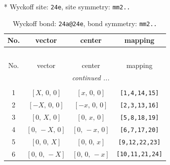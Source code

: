 \documentclass[fleqn,8pt]{jsarticle}
\begin{document}
* Wyckoff site: {\tt 24e}, site symmetry: {\tt mm2..}
\renewcommand{\arraystretch}{1.2}
\begin{longtable}{cccc}
\caption{Wyckoff bond: {\tt 24a@24e}, bond symmetry: {\tt mm2..}}
 \\
 \hline \hline
No. & vector & center & mapping \\ \hline \endfirsthead

\multicolumn{3}{l}{\tablename\ \thetable{}} \\
 \hline \hline
No. & vector & center & mapping \\ \hline \endhead

 \hline \hline
\multicolumn{3}{r}{\footnotesize\it continued ...} \\ \endfoot

 \hline \hline
\multicolumn{3}{r}{} \\ \endlastfoot

1 & $\left[ X,\, 0,\, 0 \right]$ & $\left[ x,\, 0,\, 0 \right]$ & {\tt [1,4,14,15]} \\ \hline
2 & $\left[ - X,\, 0,\, 0 \right]$ & $\left[ - x,\, 0,\, 0 \right]$ & {\tt [2,3,13,16]} \\ \hline
3 & $\left[ 0,\, X,\, 0 \right]$ & $\left[ 0,\, x,\, 0 \right]$ & {\tt [5,8,18,19]} \\ \hline
4 & $\left[ 0,\, - X,\, 0 \right]$ & $\left[ 0,\, - x,\, 0 \right]$ & {\tt [6,7,17,20]} \\ \hline
5 & $\left[ 0,\, 0,\, X \right]$ & $\left[ 0,\, 0,\, x \right]$ & {\tt [9,12,22,23]} \\ \hline
6 & $\left[ 0,\, 0,\, - X \right]$ & $\left[ 0,\, 0,\, - x \right]$ & {\tt [10,11,21,24]} \\
\end{longtable}
\renewcommand{\arraystretch}{1.2}
\end{document}
